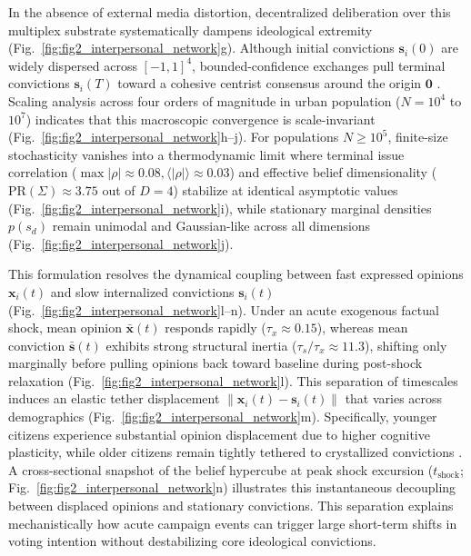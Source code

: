 \documentclass[a4paper,fleqn]{cas-dc}
\begin{document}
In the absence of external media distortion, decentralized deliberation over this multiplex substrate systematically dampens ideological extremity (Fig.~\ref{fig:fig2_interpersonal_network}g). Although initial convictions $\mathbf{s}_i(0)$ are widely dispersed across $[-1, 1]^4$, bounded-confidence exchanges pull terminal convictions $\mathbf{s}_i(T)$ toward a cohesive centrist consensus around the origin $\mathbf{0}$ \citep{castellano2009statistical}. Scaling analysis across four orders of magnitude in urban population ($N = 10^4$ to $10^7$) indicates that this macroscopic convergence is scale-invariant (Fig.~\ref{fig:fig2_interpersonal_network}h--j). For populations $N \ge 10^5$, finite-size stochasticity vanishes into a thermodynamic limit where terminal issue correlation ($\max |\rho| \approx 0.08, \langle |\rho| \rangle \approx 0.03$) and effective belief dimensionality ($\mathrm{PR}(\Sigma) \approx 3.75$ out of $D=4$) stabilize at identical asymptotic values (Fig.~\ref{fig:fig2_interpersonal_network}i), while stationary marginal densities $p(s_d)$ remain unimodal and Gaussian-like across all dimensions (Fig.~\ref{fig:fig2_interpersonal_network}j).

This formulation resolves the dynamical coupling between fast expressed opinions $\mathbf{x}_i(t)$ and slow internalized convictions $\mathbf{s}_i(t)$ \citep{zaller1992nature, howe2017attitude} (Fig.~\ref{fig:fig2_interpersonal_network}l--n). Under an acute exogenous factual shock, mean opinion $\bar{\mathbf{x}}(t)$ responds rapidly ($\tau_x \approx 0.15$), whereas mean conviction $\bar{\mathbf{s}}(t)$ exhibits strong structural inertia ($\tau_s / \tau_x \approx 11.3$), shifting only marginally before pulling opinions back toward baseline during post-shock relaxation (Fig.~\ref{fig:fig2_interpersonal_network}l). This separation of timescales induces an elastic tether displacement $\|\mathbf{x}_i(t) - \mathbf{s}_i(t)\|$ that varies across demographics (Fig.~\ref{fig:fig2_interpersonal_network}m). Specifically, younger citizens experience substantial opinion displacement due to higher cognitive plasticity, while older citizens remain tightly tethered to crystallized convictions \citep{alwin1991aging}. A cross-sectional snapshot of the belief hypercube at peak shock excursion ($t_{\mathrm{shock}}$; Fig.~\ref{fig:fig2_interpersonal_network}n) illustrates this instantaneous decoupling between displaced opinions and stationary convictions. This separation explains mechanistically how acute campaign events can trigger large short-term shifts in voting intention without destabilizing core ideological convictions.
\end{document}
